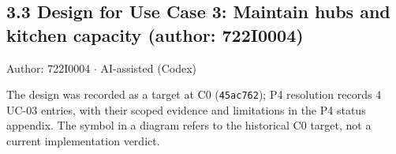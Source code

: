 \subsection*{3.3 Design for Use Case 3: Maintain hubs and kitchen capacity (author: 722I0004)}
Author: 722I0004 \ensuremath{\cdot} AI-assisted (Codex)

The design was recorded as a target at C0 (\texttt{45ac762}); P4 resolution records 4 UC-03 entries, with their scoped evidence and limitations in the P4 status appendix. The \textdagger{} symbol in a diagram refers to the historical C0 target, not a current implementation verdict.
